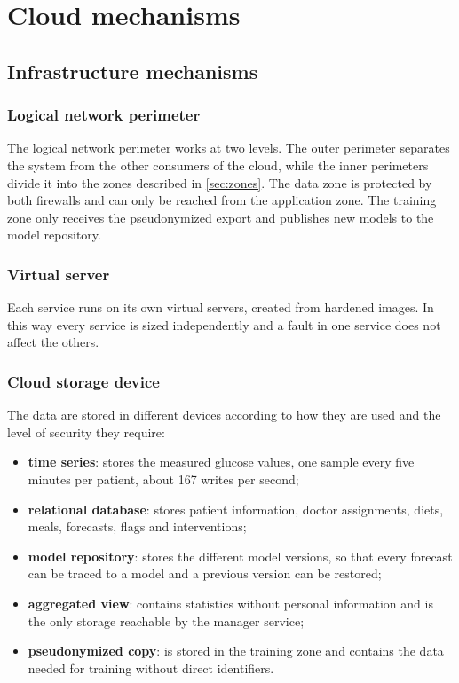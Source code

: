 \chapter{Cloud mechanisms}
\label{ch:mechanisms}

\section{Infrastructure mechanisms}

\subsection{Logical network perimeter}

The logical network perimeter works at two levels. The outer perimeter
separates the system from the other consumers of the cloud, while the inner
perimeters divide it into the zones described in \cref{sec:zones}.
The data zone is protected by both firewalls and can only be reached from
the application zone. The training zone only receives the pseudonymized export
and publishes new models to the model repository.

\subsection{Virtual server}

Each service runs on its own virtual servers, created from hardened images.
In this way every service is sized independently and a fault in one service
does not affect the others.

\subsection{Cloud storage device}

The data are stored in different devices according to how they are used
and the level of security they require:

\begin{itemize}
    \item \textbf{time series}: stores the measured glucose values, one sample every five minutes per patient, about 167 writes per second;
    \item \textbf{relational database}: stores patient information, doctor assignments, diets,
          meals, forecasts, flags and interventions;
    \item \textbf{model repository}: stores the different model versions, so that every forecast
          can be traced to a model and a previous version can be restored;
    \item \textbf{aggregated view}: contains statistics without personal information and is the only storage reachable by the manager service;
    \item \textbf{pseudonymized copy}: is stored in the training zone and contains the data needed for training without direct identifiers.
\end{itemize}

